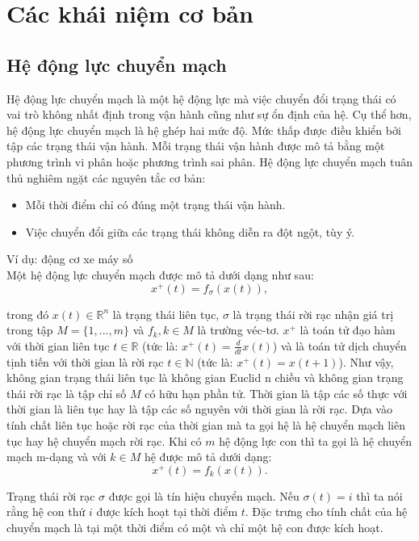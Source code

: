 \documentclass[14pt,a4paper,oneside]{report}		%
\begin{document}
\chapter{Các khái niệm cơ bản}
\section{Hệ động lực chuyển mạch}
Hệ động lực chuyển mạch là một hệ động lực mà việc chuyển đổi trạng thái có vai trò không nhất định trong vận hành cũng như sự ổn định của hệ. Cụ thể hơn, hệ động lực chuyển mạch là hệ ghép hai mức độ. Mức thấp được điều khiển bởi tập các trạng thái vận hành. Mỗi trạng thái vận hành được mô tả bằng một phương trình vi phân hoặc phương trình sai phân. Hệ động lực chuyển mạch tuân thủ nghiêm ngặt các nguyên tắc cơ bản:
\begin{itemize}
  \item Mỗi thời điểm chỉ có đúng một trạng thái vận hành.
  \item Việc chuyển đổi giữa các trạng thái không diễn ra đột ngột, tùy ý.
\end{itemize}
Ví dụ: động cơ xe máy số
\\

Một hệ động lực chuyển mạch được mô tả dưới dạng như sau:
\begin{equation} \label{eq1-1}
x^+(t) = f_\sigma(x(t)),
\end{equation}

trong đó $x(t)\in\mathbb{R}^n$ là trạng thái liên tục, $\sigma$ là trạng thái rời rạc nhận giá trị trong tập $M = \{1,...,m\}$ và $f_k, k\in M$ là trường véc-tơ. $x^+$ là toán tử đạo hàm với thời gian liên tục $t\in\mathbb{R}$ (tức là: $x^+(t)=\frac{d}{dt}x(t)$) và là toán tử dịch chuyển tịnh tiến với thời gian là rời rạc $t\in\mathbb{N}$ (tức là: $x^+(t)=x(t+1)$). Như vậy, không gian trạng thái liên tục là không gian Euclid n chiều và không gian trạng thái rời rạc là tập chỉ số $M$ có hữu hạn phần tử. Thời gian là tập các số thực với thời gian là liên tục hay là tập các số nguyên với thời gian là rời rạc. Dựa vào tính chất liên tục hoặc rời rạc của thời gian mà ta gọi hệ là hệ chuyển mạch liên tục hay hệ chuyển mạch rời rạc. Khi có $m$ hệ động lực con thì ta gọi là hệ chuyển mạch m-dạng và với $k\in M$ hệ được mô tả dưới dạng:
\begin{equation} \label{eq1-2}
x^+(t) = f_k(x(t)).
\end{equation}

Trạng thái rời rạc $\sigma$ được gọi là tín hiệu chuyển mạch. Nếu $\sigma(t)=i$ thì ta nói rằng hệ con thứ $i$ được kích hoạt tại thời điểm $t$. Đặc trưng cho tính chất của hệ chuyển mạch là tại một thời điểm có một và chỉ một hệ con được kích hoạt.\\
\end{document}
